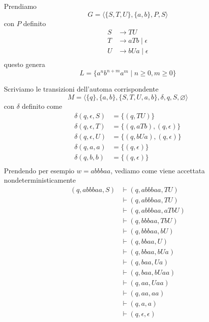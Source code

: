 \documentclass[12pt]{report}
\begin{document}
\begin{tcolorbox}[breakable]
 	Prendiamo
 	$$ G = \langle \{S, T, U\}, \{a, b\}, P, S \rangle $$
 	con $P$ definito
 	\begin{align*}
 		S &\rightarrow TU  \\
 		T &\rightarrow a T b \mid \epsilon \\
 		U &\rightarrow b U a \mid \epsilon \\
 	\end{align*}
 	questo genera
 	$$ L = \{ a^n b^{n + m} a^m \mid n \geq 0, m \geq 0 \} $$
 
 	Scriviamo le transizioni dell'automa corrispondente
 	$$ M = \langle \{q\}, \{a, b\}, \{S, T, U, a, b\}, \delta, q, S, \varnothing \rangle $$
 	con $\delta$ definito come
 	\begin{align*}
 		\delta(q, \epsilon, S) &= \{(q, TU)\} \\
 		\delta(q, \epsilon, T) &= \{(q, a T b), (q, \epsilon) \} \\
 		\delta(q, \epsilon, U) &= \{(q, b U a), (q, \epsilon) \} \\
 		\delta(q, a, a) &= \{(q, \epsilon)\} \\
 		\delta(q, b, b) &= \{(q, \epsilon)\} \\
 	\end{align*}
 	\newpage
 	Prendendo per esempio $w = abbbaa$, vediamo come viene accettata nondeterministicamente
 	\begin{align*}
 		(q, abbbaa, S) &\vdash (q, abbbaa, TU) \\
 		               &\vdash (q, abbbaa, TU) \\
 		               &\vdash (q, abbbaa, aTbU) \\
 		               &\vdash (q, bbbaa, TbU) \\
 		               &\vdash (q, bbbaa, bU) \\
 		               &\vdash (q, bbaa, U) \\
 		               &\vdash (q, bbaa, bUa) \\
 		               &\vdash (q, baa, Ua) \\
		               &\vdash (q, baa, bUaa) \\
 		               &\vdash (q, aa, Uaa) \\
 		               &\vdash (q, aa, aa) \\
 		               &\vdash (q, a, a) \\
 		               &\vdash (q, \epsilon, \epsilon) \\

\end{align*}
\end{tcolorbox}
\end{document}
